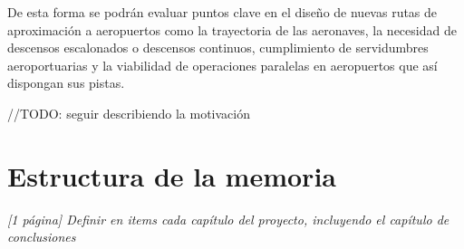 De esta forma se podrán evaluar puntos clave en el diseño de nuevas rutas de aproximación a aeropuertos como la trayectoria de las aeronaves, la necesidad de descensos escalonados o descensos continuos, cumplimiento de servidumbres aeroportuarias y la viabilidad de operaciones paralelas en aeropuertos que así dispongan sus pistas.

//TODO: seguir describiendo la motivación



\section{Estructura de la memoria}
\label{sec:estructura}

\textit{[1 página] Definir en items cada capítulo del proyecto, incluyendo el capítulo de conclusiones}